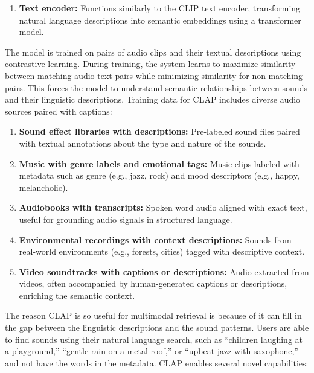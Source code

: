 \documentclass[conference]{IEEEtran}
\begin{document}
\begin{enumerate}
\begin{enumerate}
    \item \textbf{Text encoder:} Functions similarly to the CLIP text encoder, transforming natural language descriptions into semantic embeddings using a transformer model.
\end{enumerate}

The model is trained on pairs of audio clips and their textual descriptions using contrastive learning. During training, the system learns to maximize similarity between matching audio-text pairs while minimizing similarity for non-matching pairs. This forces the model to understand semantic relationships between sounds and their linguistic descriptions.
Training data for CLAP includes diverse audio sources paired with captions:

\begin{enumerate}
    \item \textbf{Sound effect libraries with descriptions:} Pre-labeled sound files paired with textual annotations about the type and nature of the sounds.
    
    \item \textbf{Music with genre labels and emotional tags:} Music clips labeled with metadata such as genre (e.g., jazz, rock) and mood descriptors (e.g., happy, melancholic).
    
    \item \textbf{Audiobooks with transcripts:} Spoken word audio aligned with exact text, useful for grounding audio signals in structured language.
    
    \item \textbf{Environmental recordings with context descriptions:} Sounds from real-world environments (e.g., forests, cities) tagged with descriptive context.
    
    \item \textbf{Video soundtracks with captions or descriptions:} Audio extracted from videos, often accompanied by human-generated captions or descriptions, enriching the semantic context.
\end{enumerate}

The reason CLAP is so useful for multimodal retrieval is because of it can fill in the gap between the linguistic descriptions and the sound patterns. Users are able to find sounds using their natural language search, such as “children laughing at a playground,” “gentle rain on a metal roof,” or “upbeat jazz with saxophone,” and not have the words in the metadata.
CLAP enables several novel capabilities:


\end{enumerate}
\end{document}
